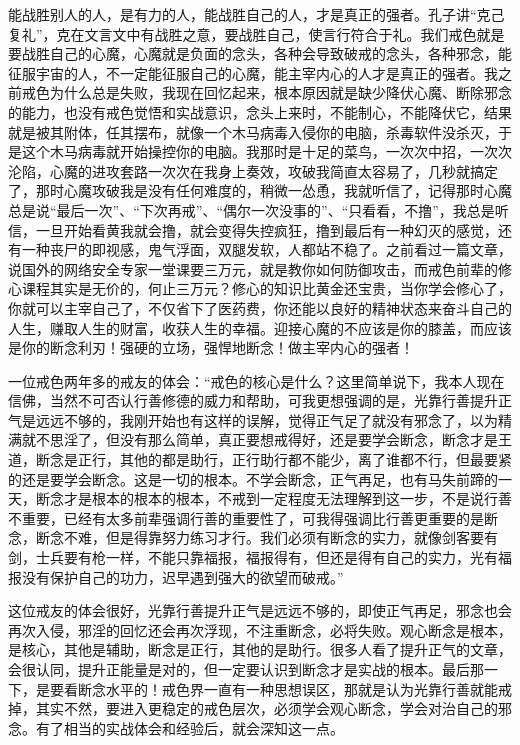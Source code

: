 能战胜别人的人，是有力的人，能战胜自己的人，才是真正的强者。孔子讲“克己复礼”，克在文言文中有战胜之意，要战胜自己，使言行符合于礼。我们戒色就是要战胜自己的心魔，心魔就是负面的念头，各种会导致破戒的念头，各种邪念，能征服宇宙的人，不一定能征服自己的心魔，能主宰内心的人才是真正的强者。我之前戒色为什么总是失败，我现在回忆起来，根本原因就是缺少降伏心魔、断除邪念的能力，也没有戒色觉悟和实战意识，念头上来时，不能制心，不能降伏它，结果就是被其附体，任其摆布，就像一个木马病毒入侵你的电脑，杀毒软件没杀灭，于是这个木马病毒就开始操控你的电脑。我那时是十足的菜鸟，一次次中招，一次次沦陷，心魔的进攻套路一次次在我身上奏效，攻破我简直太容易了，几秒就搞定了，那时心魔攻破我是没有任何难度的，稍微一怂恿，我就听信了，记得那时心魔总是说“最后一次”、“下次再戒”、“偶尔一次没事的”、“只看看，不撸”，我总是听信，一旦开始看黄我就会撸，就会变得失控疯狂，撸到最后有一种幻灭的感觉，还有一种丧尸的即视感，鬼气浮面，双腿发软，人都站不稳了。之前看过一篇文章，说国外的网络安全专家一堂课要三万元，就是教你如何防御攻击，而戒色前辈的修心课程其实是无价的，何止三万元？修心的知识比黄金还宝贵，当你学会修心了，你就可以主宰自己了，不仅省下了医药费，你还能以良好的精神状态来奋斗自己的人生，赚取人生的财富，收获人生的幸福。迎接心魔的不应该是你的膝盖，而应该是你的断念利刃！强硬的立场，强悍地断念！做主宰内心的强者！

一位戒色两年多的戒友的体会：“戒色的核心是什么？这里简单说下，我本人现在信佛，当然不可否认行善修德的威力和帮助，可我更想强调的是，光靠行善提升正气是远远不够的，我刚开始也有这样的误解，觉得正气足了就没有邪念了，以为精满就不思淫了，但没有那么简单，真正要想戒得好，还是要学会断念，断念才是王道，断念是正行，其他的都是助行，正行助行都不能少，离了谁都不行，但最要紧的还是要学会断念。这是一切的根本。不学会断念，正气再足，也有马失前蹄的一天，断念才是根本的根本的根本，不戒到一定程度无法理解到这一步，不是说行善不重要，已经有太多前辈强调行善的重要性了，可我得强调比行善更重要的是断念，断念不难，但是得靠努力练习才行。我们必须有断念的实力，就像剑客要有剑，士兵要有枪一样，不能只靠福报，福报得有，但还是得有自己的实力，光有福报没有保护自己的功力，迟早遇到强大的欲望而破戒。”

这位戒友的体会很好，光靠行善提升正气是远远不够的，即使正气再足，邪念也会再次入侵，邪淫的回忆还会再次浮现，不注重断念，必将失败。观心断念是根本，是核心，其他是辅助，断念是正行，其他的是助行。很多人看了提升正气的文章，会很认同，提升正能量是对的，但一定要认识到断念才是实战的根本。最后那一下，是要看断念水平的！戒色界一直有一种思想误区，那就是认为光靠行善就能戒掉，其实不然，要进入更稳定的戒色层次，必须学会观心断念，学会对治自己的邪念。有了相当的实战体会和经验后，就会深知这一点。

